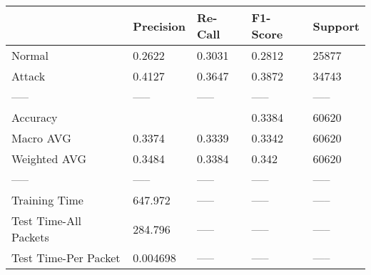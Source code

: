 \begin{tabular}{lllll}
\toprule
{} & Precision & Re-Call & F1-Score & Support \\
\midrule
Normal                &    0.2622 &  0.3031 &   0.2812 &   25877 \\
Attack                &    0.4127 &  0.3647 &   0.3872 &   34743 \\
-----                 &     ----- &   ----- &    ----- &   ----- \\
Accuracy              &           &         &   0.3384 &   60620 \\
Macro AVG             &    0.3374 &  0.3339 &   0.3342 &   60620 \\
Weighted AVG          &    0.3484 &  0.3384 &    0.342 &   60620 \\
-----                 &     ----- &   ----- &    ----- &   ----- \\
Training Time         &   647.972 &   ----- &    ----- &   ----- \\
Test Time-All Packets &   284.796 &   ----- &    ----- &   ----- \\
Test Time-Per Packet  &  0.004698 &   ----- &    ----- &   ----- \\
\bottomrule
\end{tabular}
